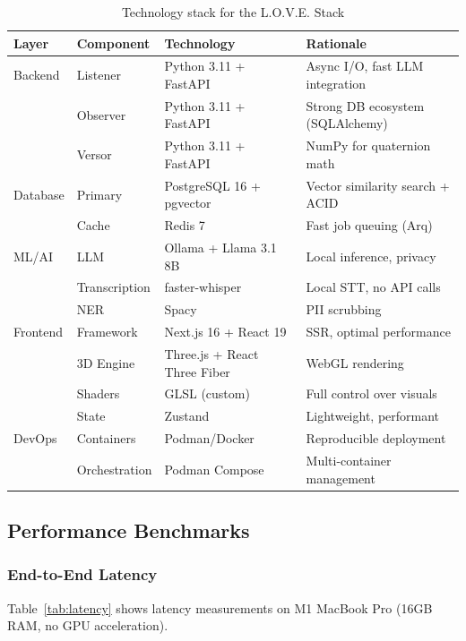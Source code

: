 \documentclass[10pt,twocolumn]{article}
\begin{document}
\begin{table}[t]
\centering
\caption{Technology stack for the L.O.V.E. Stack}
\label{tab:tech-stack}
\small
\begin{tabular}{llll}
\toprule
\textbf{Layer} & \textbf{Component} & \textbf{Technology} & \textbf{Rationale} \\
\midrule
Backend & Listener & Python 3.11 + FastAPI & Async I/O, fast LLM integration \\
& Observer & Python 3.11 + FastAPI & Strong DB ecosystem (SQLAlchemy) \\
& Versor & Python 3.11 + FastAPI & NumPy for quaternion math \\
\midrule
Database & Primary & PostgreSQL 16 + pgvector & Vector similarity search + ACID \\
& Cache & Redis 7 & Fast job queuing (Arq) \\
\midrule
ML/AI & LLM & Ollama + Llama 3.1 8B & Local inference, privacy \\
& Transcription & faster-whisper & Local STT, no API calls \\
& NER & Spacy & PII scrubbing \\
\midrule
Frontend & Framework & Next.js 16 + React 19 & SSR, optimal performance \\
& 3D Engine & Three.js + React Three Fiber & WebGL rendering \\
& Shaders & GLSL (custom) & Full control over visuals \\
& State & Zustand & Lightweight, performant \\
\midrule
DevOps & Containers & Podman/Docker & Reproducible deployment \\
& Orchestration & Podman Compose & Multi-container management \\
\bottomrule
\end{tabular}
\end{table}

\subsection{Performance Benchmarks}

\subsubsection{End-to-End Latency}

Table~\ref{tab:latency} shows latency measurements on M1 MacBook Pro (16GB RAM, no GPU acceleration).
\end{document}
